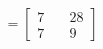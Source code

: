 \documentclass[preview]{standalone}
\begin{document}
\begin{align*}
=\begin{bmatrix} 7 & \quad 28 \\ 7 & \quad 9 \end{bmatrix}
\end{align*}
\end{document}
